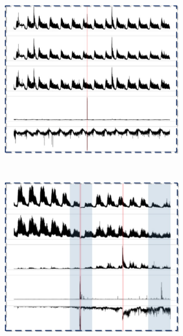 \documentclass[letterpaper,12pt]{article}
\begin{document}
\begin{figure}[htbp]
\begin{subfigure}{0.2\textwidth}
			\captionsetup{font=scriptsize}
			\caption{}
			\label{fig: cdn_kpi_b}
		\end{subfigure}
		\begin{subfigure}{0.2\textwidth}
			\includegraphics[width=\linewidth]{CDN_KPI/cdn_kpi_c}
			\captionsetup{font=scriptsize}
			\caption{}
			\label{fig: cdn_kpi_c}	
		\end{subfigure}\\
		\begin{subfigure}{0.2\textwidth}
			\includegraphics[width=\linewidth]{CDN_KPI/cdn_kpi_d}

\end{subfigure}
\end{figure}
\end{document}
